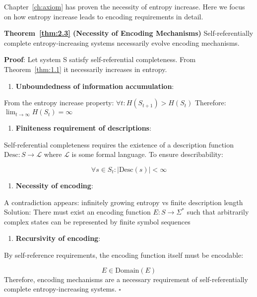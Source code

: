 Chapter~\ref{ch:axiom} has proven the necessity of entropy increase. Here we focus on how entropy increase leads to encoding requirements in detail.

\textbf{Theorem~\ref{thm:2.3} (Necessity of Encoding Mechanisms)}
\label{thm:2.3}
Self-referentially complete entropy-increasing systems necessarily evolve encoding mechanisms.

\textbf{Proof}:
Let system S satisfy self-referential completeness. From Theorem~\ref{thm:1.1} it necessarily increases in entropy.

\begin{enumerate}
\item \textbf{Unboundedness of information accumulation}:
\end{enumerate}
   From the entropy increase property: $\forall t: H(S_{t+1}) > H(S_t)$
   Therefore: $\lim_{t \to \infty} H(S_t) = \infty$
   
\begin{enumerate}
\item \textbf{Finiteness requirement of descriptions}:
\end{enumerate}
   Self-referential completeness requires the existence of a description function $\text{Desc}: S \to \mathcal{L}$
   where $\mathcal{L}$ is some formal language. To ensure describability:
   
\begin{equation}
\forall s \in S_t: |\text{Desc}(s)| < \infty
\end{equation}

\begin{enumerate}
\item \textbf{Necessity of encoding}:
\end{enumerate}
   A contradiction appears: infinitely growing entropy vs finite description length
   Solution: There must exist an encoding function $E: S \to \Sigma^*$
   such that arbitrarily complex states can be represented by finite symbol sequences
   
\begin{enumerate}
\item \textbf{Recursivity of encoding}:
\end{enumerate}
   By self-reference requirements, the encoding function itself must be encodable:
   
\begin{equation}
E \in \text{Domain}(E)
\end{equation}
Therefore, encoding mechanisms are a necessary requirement of self-referentially complete entropy-increasing systems. $\square$

